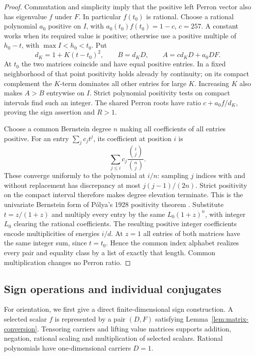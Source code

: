 \begin{proof}
Commutation and simplicity imply that the positive left Perron vector also has eigenvalue \(f\) under \(F\). In particular \(f(t_0)\) is rational. Choose a rational polynomial \(a_0\) positive on \(I\), with \(a_0(t_0)f(t_0)=1-c\), \(c=257\). A constant works when its required value is positive; otherwise use a positive multiple of \(h_0-t\), with \(\max I<h_0<t_0\). Put
\begin{equation}\label{eq:matrix-conversion}
d_K=1+K(t-t_0)^2,\qquad B=d_KD,\qquad A=cd_KD+a_0DF.
\end{equation}
At \(t_0\) the two matrices coincide and have equal positive entries. In a fixed neighborhood of that point positivity holds already by continuity; on its compact complement the \(K\)-term dominates all other entries for large \(K\). Increasing \(K\) also makes \(A>B\) entrywise on \(I\). Strict polynomial positivity tests on compact intervals find such an integer. The shared Perron roots have ratio \(c+a_0f/d_K\), proving the sign assertion and \(R>1\).

Choose a common Bernstein degree \(n\) making all coefficients of all entries positive. For an entry \(\sum_jc_jt^j\), its coefficient at position \(i\) is
\[
\sum_{j\le i}c_j\frac{\binom{i}{j}}{\binom{n}{j}}.
\]
These converge uniformly to the polynomial at \(i/n\): sampling \(j\) indices with and without replacement has discrepancy at most \(j(j-1)/(2n)\). Strict positivity on the compact interval therefore makes degree elevation terminate. This is the univariate Bernstein form of P\'olya's 1928 positivity theorem \cite{powersReznick}. Substitute \(t=z/(1+z)\) and multiply every entry by the same \(L_0(1+z)^n\), with integer \(L_0\) clearing the rational coefficients. The resulting positive integer coefficients encode multiplicities of energies \(i/d\). At \(z=1\) all entries of both matrices have the same integer sum, since \(t=t_0\). Hence the common index alphabet realizes every pair and equality class by a list of exactly that length. Common multiplication changes no Perron ratio.
\end{proof}

\subsection{Sign operations and individual conjugates}\label{sec:signs}

For orientation, we first give a direct finite-dimensional sign construction. A selected scalar \(f\) is represented by a pair \((D,F)\) satisfying Lemma~\ref{lem:matrix-conversion}. Tensoring carriers and lifting value matrices supports addition, negation, rational scaling and multiplication of selected scalars. Rational polynomials have one-dimensional carriers \(D=1\).

